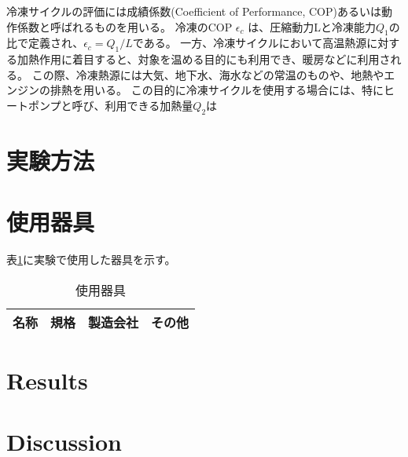\documentclass{jarticle}
\begin{document}
	\par 冷凍サイクルの評価には成績係数(Coefficient of Performance, COP)あるいは動作係数と呼ばれるものを用いる。
	冷凍のCOP $\epsilon_c$ は、圧縮動力Lと冷凍能力$Q_1$の比で定義され、$\epsilon_c = Q_1/L$である。
	一方、冷凍サイクルにおいて高温熱源に対する加熱作用に着目すると、対象を温める目的にも利用でき、暖房などに利用される。
	この際、冷凍熱源には大気、地下水、海水などの常温のものや、地熱やエンジンの排熱を用いる。
	この目的に冷凍サイクルを使用する場合には、特にヒートポンプと呼び、利用できる加熱量$Q_2$は

\section{実験方法}
\section{使用器具}
表\ref{tb:Experimental Equipment}に実験で使用した器具を示す。
\begin{table}[H]
	\centering
	\caption{使用器具}
	\label{tb:Experimental Equipment}
	\begin{tabular}{c|c|c|c} \hline
		名称 & 規格 & 製造会社 & その他\\ \hline
	\end{tabular}
\end{table}
\section{Results}
\section{Discussion}

\begin{thebibliography}{99}
\end{thebibliography}
\end{document}
